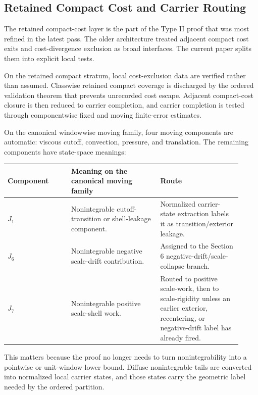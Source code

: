 \documentclass[11pt]{amsart}
\begin{document}
\subsection{Retained Compact Cost and Carrier Routing}

The retained compact-cost layer is the part of the Type II proof that was most refined in the latest pass.  The older architecture treated adjacent compact cost exits and cost-divergence exclusion as broad interfaces.  The current paper splits them into explicit local tests.

On the retained compact stratum, local cost-exclusion data are verified rather than assumed.  Classwise retained compact coverage is discharged by the ordered validation theorem that prevents unrecorded cost escape.  Adjacent compact-cost closure is then reduced to carrier completion, and carrier completion is tested through componentwise fixed and moving finite-error estimates.

On the canonical windowwise moving family, four moving components are automatic: viscous cutoff, convection, pressure, and translation.  The remaining components have state-space meanings:

\begin{longtable}{@{}>{\raggedright\arraybackslash}p{0.25\linewidth}>{\raggedright\arraybackslash}p{0.35\linewidth}>{\raggedright\arraybackslash}p{0.32\linewidth}@{}}
\toprule
\textbf{Component} & \textbf{Meaning on the canonical moving family} & \textbf{Route} \\
\midrule
\endhead
\(J_1\) & Nonintegrable cutoff-transition or shell-leakage component. & Normalized carrier-state extraction labels it as transition/exterior leakage. \\
\(J_6\) & Nonintegrable negative scale-drift contribution. & Assigned to the Section 6 negative-drift/scale-collapse branch. \\
\(J_7\) & Nonintegrable positive scale-shell work. & Routed to positive scale-work, then to scale-rigidity unless an earlier exterior, recentering, or negative-drift label has already fired. \\
\bottomrule
\end{longtable}

This matters because the proof no longer needs to turn nonintegrability into a pointwise or unit-window lower bound.  Diffuse nonintegrable tails are converted into normalized local carrier states, and those states carry the geometric label needed by the ordered partition.
\end{document}
